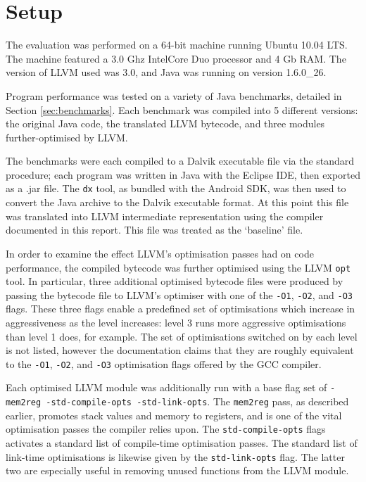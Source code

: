 \section{Setup}
\label{sec:setup}

The evaluation was performed on a 64-bit machine running Ubuntu 10.04 LTS. The machine featured a 3.0 Ghz Intel\textregistered Core Duo processor and 4 Gb RAM. The version of LLVM used was 3.0, and Java was running on version 1.6.0\_26.

Program performance was tested on a variety of Java benchmarks, detailed in Section \ref{sec:benchmarks}. Each benchmark was compiled into 5 different versions: the original Java code, the translated LLVM bytecode, and three modules further-optimised by LLVM. 

The benchmarks were each compiled to a Dalvik executable file via the standard procedure; each program was written in Java with the Eclipse IDE, then exported as a .jar file. The \verb|dx| tool, as bundled with the Android SDK, was then used to convert the Java archive to the Dalvik executable format. At this point this file was translated into LLVM intermediate representation using the compiler documented in this report. This file was treated as the `baseline' file. 

In order to examine the effect LLVM's optimisation passes had on code performance, the compiled bytecode was further optimised using the LLVM \verb|opt| tool. In particular, three additional optimised bytecode files were produced by passing the bytecode file to LLVM's optimiser with one of the \verb|-O1|, \verb|-O2|, and \verb|-O3| flags. These three flags enable a predefined set of optimisations which increase in aggressiveness as the level increases: level 3 runs more aggressive optimisations than level 1 does, for example. The set of optimisations switched on by each level is not listed, however the documentation claims that they are roughly equivalent to the \verb|-O1|, \verb|-O2|, and \verb|-O3| optimisation flags offered by the GCC compiler\footnotemark {}.

Each optimised LLVM module was additionally run with a base flag set of \verb|-mem2reg -std-compile-opts -std-link-opts|. The \verb|mem2reg| pass, as described earlier, promotes stack values and memory to registers, and is one of the vital optimisation passes the compiler relies upon. The \verb|std-compile-opts| flags activates a standard list of compile-time optimisation passes. The standard list of link-time optimisations is likewise given by the \verb|std-link-opts| flag. The latter two are especially useful in removing unused functions from the LLVM module.

